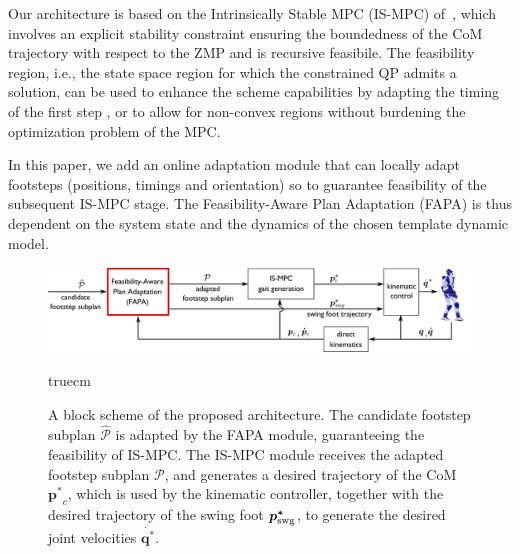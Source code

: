 

Our architecture is based on the Intrinsically Stable MPC (IS-MPC) of~\cite{ScDeLaOr:20}, which involves an explicit stability constraint ensuring the boundedness of the CoM trajectory with respect to the ZMP and is recursive feasibile. 
The feasibility region, i.e., the state space region for which the constrained QP admits a solution, can be used to enhance the scheme capabilities by adapting the timing of the first step \cite{Smaldone2021FeasibilityDrivenSTA}, or to allow for non-convex regions \cite{Habib2022HandlingNonConvex} without burdening the optimization problem of the MPC.

In this paper, we add an online adaptation module that can locally adapt footsteps (positions, timings and orientation) so to guarantee feasibility of the subsequent IS-MPC stage. The Feasibility-Aware Plan Adaptation (FAPA) is thus dependent on the system state and the dynamics of the chosen template dynamic model.


\begin{figure}
\centering\includegraphics[width=\textwidth]{figures/BlockScheme-NLP-STA.pdf}
\caption{A block scheme of the proposed architecture. The candidate footstep subplan $\mathcal{\hat{P}}$ is adapted by the FAPA module, guaranteeing the feasibility of IS-MPC. The IS-MPC module receives the adapted footstep subplan $\mathcal{P}$, and generates a desired trajectory of the CoM $\bm{p^*}_c$, which is used by the kinematic controller, together with the desired trajectory of the swing foot $\bm{p^*}_{\rm swg}$, to generate the desired joint velocities $\dot{\bm{q^*}}$.}
\label{fig:FAPA:block_scheme}
 truecm
\end{figure}

